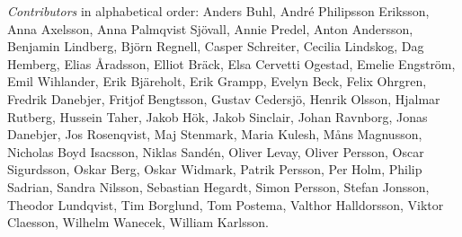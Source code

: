 \emph{Contributors} in alphabetical order:
Anders Buhl,
André Philipsson Eriksson,
Anna Axelsson,
Anna Palmqvist Sjövall,
Annie Predel,
Anton Andersson,
Benjamin Lindberg,
Björn Regnell,
Casper Schreiter,
Cecilia Lindskog,
Dag Hemberg,
Elias Åradsson,
Elliot Bräck,
Elsa Cervetti Ogestad,
Emelie Engström,
Emil Wihlander,
Erik Bjäreholt,
Erik Grampp,
Evelyn Beck,
Felix Ohrgren,
Fredrik Danebjer,
Fritjof Bengtsson,
Gustav Cedersjö,
Henrik Olsson,
Hjalmar Rutberg,
Hussein Taher,
Jakob Hök,
Jakob Sinclair,
Johan Ravnborg,
Jonas Danebjer,
Jos Rosenqvist,
Maj Stenmark,
Maria Kulesh,
Måns Magnusson,
Nicholas Boyd Isacsson,
Niklas Sandén,
Oliver Levay,
Oliver Persson,
Oscar Sigurdsson,
Oskar Berg,
Oskar Widmark,
Patrik Persson,
Per Holm,
Philip Sadrian,
Sandra Nilsson,
Sebastian Hegardt,
Simon Persson,
Stefan Jonsson,
Theodor Lundqvist,
Tim Borglund,
Tom Postema,
Valthor Halldorsson,
Viktor Claesson,
Wilhelm Wanecek,
William Karlsson.